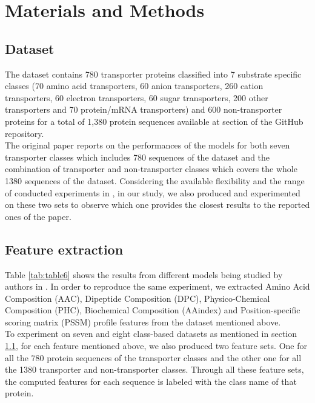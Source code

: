 \section{Materials and Methods}
\label{sec:materials}

    \subsection{Dataset}
    \label{sec:dataset}

    The dataset contains 780 transporter proteins classified into 7 substrate specific classes (70 amino acid transporters, 
    60 anion transporters, 260 cation transporters, 60 electron transporters,  60 sugar transporters, 
    200 other transporters and 70 protein/mRNA transporters) and 600 non-transporter proteins for a total of 1,380 protein 
    sequences available at  section of the GitHub repository.\\

    The original paper \cite{mishra2014prediction} reports on the performances of the models for both seven transporter 
    classes which includes 780 sequences of the dataset and the combination of transporter and non-transporter classes 
    which covers the whole 1380 sequences of the dataset. Considering the available flexibility and the range of conducted 
    experiments in \cite{mishra2014prediction}, in our study, we also produced and experimented on these two sets 
    to observe which one provides the closest results to the reported ones of the paper.

    \subsection{Feature extraction}

    Table \ref{tab:table6} shows the results from different models being studied by authors in \cite{mishra2014prediction}.
    In order to reproduce the same experiment, we extracted Amino Acid Composition (AAC), Dipeptide Composition (DPC), 
    Physico-Chemical Composition (PHC), Biochemical Composition (AAindex) and Position-specific scoring matrix (PSSM) profile 
    features from the dataset mentioned above.\\

    To experiment on seven and eight class-based datasets as mentioned in section \ref{sec:dataset}, 
    for each feature mentioned above, we also produced two feature sets. One for all the 780 protein sequences 
    of the transporter classes and the other one for all the 1380 transporter and non-transporter classes. 
    Through all these feature sets, the computed features for each sequence is labeled with the class name of that protein.



